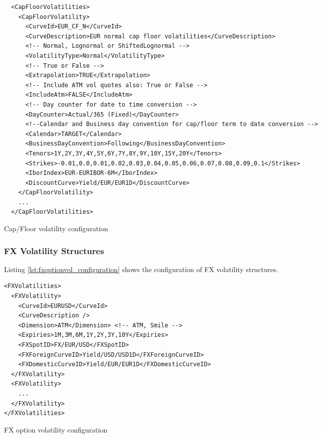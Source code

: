 \documentclass[12pt, a4paper]{article}
\newenvironment{longlisting}{\captionsetup{type=listing}}{}
\begin{document}
\begin{longlisting}
\begin{verbatim}
  <CapFloorVolatilities>
    <CapFloorVolatility>
      <CurveId>EUR_CF_N</CurveId>
      <CurveDescription>EUR normal cap floor volatilities</CurveDescription>
      <!-- Normal, Lognormal or ShiftedLognormal -->
      <VolatilityType>Normal</VolatilityType>
      <!-- True or False -->
      <Extrapolation>TRUE</Extrapolation>
      <!-- Include ATM vol quotes also: True or False -->
      <IncludeAtm>FALSE</IncludeAtm>
      <!-- Day counter for date to time conversion -->
      <DayCounter>Actual/365 (Fixed)</DayCounter>
      <!--Calendar and Business day convention for cap/floor term to date conversion -->
      <Calendar>TARGET</Calendar>
      <BusinessDayConvention>Following</BusinessDayConvention>
      <Tenors>1Y,2Y,3Y,4Y,5Y,6Y,7Y,8Y,9Y,10Y,15Y,20Y</Tenors>
      <Strikes>-0.01,0.0,0.01,0.02,0.03,0.04,0.05,0.06,0.07,0.08,0.09,0.1</Strikes>
      <IborIndex>EUR-EURIBOR-6M</IborIndex>
      <DiscountCurve>Yield/EUR/EUR1D</DiscountCurve>
    </CapFloorVolatility>
    ...
  </CapFloorVolatilities>
\end{verbatim}
\caption{Cap/Floor volatility configuration}
\label{lst:capfloorvol_configuration}
\end{longlisting}

\subsubsection{FX Volatility Structures}

Listing \ref{lst:fxoptionvol_configuration} shows the configuration of FX volatility structures.

\begin{longlisting}
\begin{verbatim}
<FXVolatilities>
  <FXVolatility>
    <CurveId>EURUSD</CurveId>
    <CurveDescription />
    <Dimension>ATM</Dimension> <!-- ATM, Smile -->
    <Expiries>1M,3M,6M,1Y,2Y,3Y,10Y</Expiries>
    <FXSpotID>FX/EUR/USD</FXSpotID>
    <FXForeignCurveID>Yield/USD/USD1D</FXForeignCurveID>
    <FXDomesticCurveID>Yield/EUR/EUR1D</FXDomesticCurveID>
  </FXVolatility>
  <FXVolatility>
    ...
  </FXVolatility>
</FXVolatilities>
\end{verbatim}
\caption{FX option volatility configuration}
\label{lst:fxoptionvol_configuration}
\end{longlisting}
\end{document}
